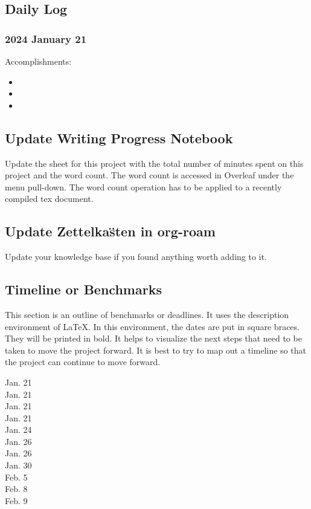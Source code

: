 \documentclass[10pt,letterpaper]{article}
\newcommand{\bi}{\begin{itemize}}
\newcommand{\ei}{\end{itemize}}
\begin{document}

\subsection{Daily Log}
\label{sub:daily-log}


\subsubsection{2024 January 21}

Accomplishments:
\bi
\item 
\item
\item
\ei



\subsection{Update Writing Progress Notebook}
\label{sub:WPsheet}

Update the sheet for this project with the total number of minutes spent on this project and the word count.
The word count is accessed in Overleaf under the menu pull-down.
The word count operation has to be applied to a recently compiled tex document.


\subsection{Update Zettelka\"sten in org-roam}
\label{sub:zk}
Update your knowledge base if you found anything worth adding to it.


\subsection{Timeline or Benchmarks}
\label{sub:benchmarks}

This section is an outline of benchmarks or deadlines.
It uses the description environment of LaTeX.
In this environment, the dates are put in square braces.
They will be printed in bold.
It helps to visualize the next steps that need to be taken to move the project forward.
It is best to try to map out a timeline so that the project can continue to move forward.


\begin{description}
\item [Jan. 21]
\item [Jan. 21]
\item [Jan. 21] 
\item [Jan. 21] 
\item [Jan. 24] 
\item [Jan. 26]
\item [Jan. 26]
\item [Jan. 30] 
\item [Feb. 5] 
\item [Feb. 8]
\item [Feb. 9]
\end{description}
\end{document}
